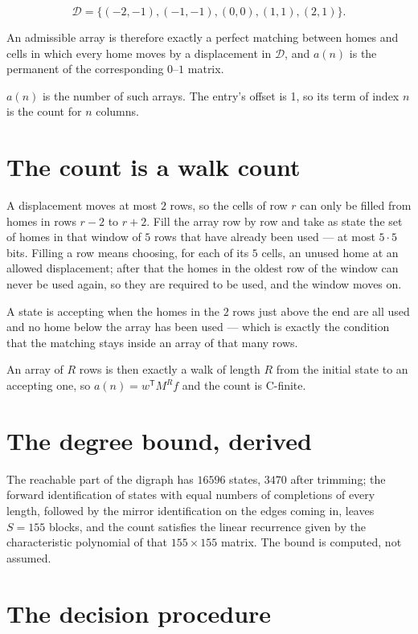 \documentclass[11pt]{article}
\theoremstyle{definition}
\begin{document}
\[\mathcal{D} = \{(-2,-1), (-1,-1), (0,0), (1,1), (2,1)\}.\]

An admissible array is therefore exactly a perfect matching between homes and cells in which every home moves by a displacement in $\mathcal{D}$, and $a(n)$ is the permanent of the corresponding $0$--$1$ matrix.

$a(n)$ is the number of such arrays. The entry's offset is 1, so its term of index $n$ is the count for $n$ columns.

\section{The count is a walk count}

A displacement moves at most $2$ rows, so the cells of row $r$ can only be filled from homes in rows $r-2$ to $r+2$. Fill the array row by row and take as state the set of homes in that window of $5$ rows that have already been used --- at most $5\cdot5$ bits. Filling a row means choosing, for each of its $5$ cells, an unused home at an allowed displacement; after that the homes in the oldest row of the window can never be used again, so they are required to be used, and the window moves on.

A state is accepting when the homes in the $2$ rows just above the end are all used and no home below the array has been used --- which is exactly the condition that the matching stays inside an array of that many rows.

An array of $R$ rows is then exactly a walk of length $R$ from the initial state to an accepting one, so $a(n) = w^{\mathsf T}M^{R}f$ and the count is C-finite.

\section{The degree bound, derived}

The reachable part of the digraph has $16596$ states, $3470$ after trimming; the forward identification of states with equal numbers of completions of every length, followed by the mirror identification on the edges coming in, leaves $S = 155$ blocks, and the count satisfies the linear recurrence given by the characteristic polynomial of that $155\times155$ matrix. The bound is computed, not assumed.

\section{The decision procedure}
\end{document}
